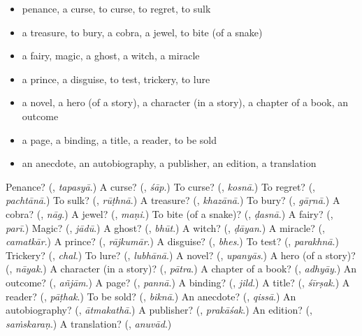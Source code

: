 \begin{itemize}
\raggedright
  \item penance, a curse, to curse, to regret, to sulk
  \item a treasure, to bury, a cobra, a jewel, to bite (of a snake)
  \item a fairy, magic, a ghost, a witch, a miracle
  \item a prince, a disguise, to test, trickery, to lure
  \item a novel, a hero (of a story), a character (in a story), a chapter of a book, an outcome
  \item a page, a binding, a title, a reader, to be sold
  \item an anecdote, an autobiography, a publisher, an edition, a translation
\end{itemize}

\begin{tcolorbox}[breakable,colback=teal!4,colframe=teal!35!black,title={Before you move on}]
Penance? (\textbf{}, \emph{tapasyā}.) A curse? (\textbf{}, \emph{śāp}.) To curse? (\textbf{}, \emph{kosnā}.) To regret? (\textbf{}, \emph{pachtānā}.) To sulk? (\textbf{}, \emph{rūṭhnā}.) A treasure? (\textbf{}, \emph{khazānā}.) To bury? (\textbf{}, \emph{gāṛnā}.) A cobra? (\textbf{}, \emph{nāg}.) A jewel? (\textbf{}, \emph{maṇi}.) To bite (of a snake)? (\textbf{}, \emph{ḍasnā}.) A fairy? (\textbf{}, \emph{parī}.) Magic? (\textbf{}, \emph{jādū}.) A ghost? (\textbf{}, \emph{bhūt}.) A witch? (\textbf{}, \emph{ḍāyan}.) A miracle? (\textbf{}, \emph{camatkār}.) A prince? (\textbf{}, \emph{rājkumār}.) A disguise? (\textbf{}, \emph{bhes}.) To test? (\textbf{}, \emph{parakhnā}.) Trickery? (\textbf{}, \emph{chal}.) To lure? (\textbf{}, \emph{lubhānā}.) A novel? (\textbf{}, \emph{upanyās}.) A hero (of a story)? (\textbf{}, \emph{nāyak}.) A character (in a story)? (\textbf{}, \emph{pātra}.) A chapter of a book? (\textbf{}, \emph{adhyāy}.) An outcome? (\textbf{}, \emph{añjām}.) A page? (\textbf{}, \emph{pannā}.) A binding? (\textbf{}, \emph{jild}.) A title? (\textbf{}, \emph{śīrṣak}.) A reader? (\textbf{}, \emph{pāṭhak}.) To be sold? (\textbf{}, \emph{biknā}.) An anecdote? (\textbf{}, \emph{qissā}.) An autobiography? (\textbf{}, \emph{ātmakathā}.) A publisher? (\textbf{}, \emph{prakāśak}.) An edition? (\textbf{}, \emph{saṁskaraṇ}.) A translation? (\textbf{}, \emph{anuvād}.)
\end{tcolorbox}
